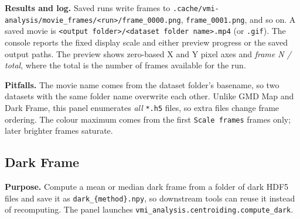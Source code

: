 \documentclass[11pt,a4paper]{article}
\newcommand{\code}[1]{\texttt{#1}}
\begin{document}
\textbf{Results and log.} Saved runs write frames to
\code{.cache/\allowbreak{}vmi-\allowbreak{}analysis/\allowbreak{}movie\_\allowbreak{}frames/\allowbreak{}<run>/\allowbreak{}frame\_\allowbreak{}0000.png},
\code{frame\_\allowbreak{}0001.png}, and so on. A saved movie is
\code{<output folder>/\allowbreak{}<dataset folder name>.mp4} (or \code{.\allowbreak{}gif}). The
console reports the fixed display scale and either preview progress or
the saved output paths. The preview shows zero-based X and Y pixel axes
and \emph{frame N / total}, where
the total is the number of frames available for the run.

\textbf{Pitfalls.} The movie name comes from the dataset folder's basename,
so two datasets with the same folder name overwrite each other. Unlike GMD
Map and Dark Frame, this panel enumerates \emph{all} \code{*.\allowbreak{}h5} files, so
extra files change frame ordering. The colour maximum comes from the first
\code{Scale frames} frames only; later brighter frames saturate.

\subsection{Dark Frame}
\label{sec:dark}

\textbf{Purpose.} Compute a mean or median dark frame from a folder of dark
HDF5 files and save it as \code{dark\_\allowbreak{}\{method\}.\allowbreak{}npy}, so downstream tools
can reuse it instead of recomputing. The panel launches
\code{vmi\_\allowbreak{}analysis.centroiding.compute\_\allowbreak{}dark}.
\end{document}
